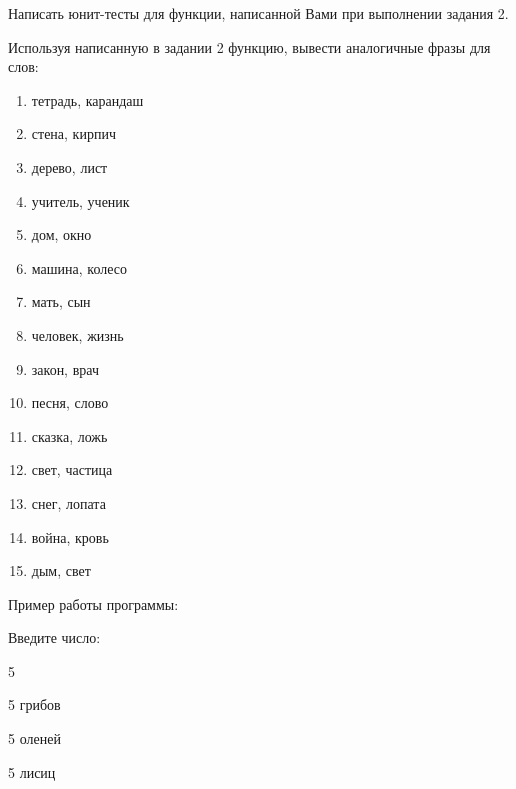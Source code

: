 \labtask

Написать юнит-тесты для функции, написанной Вами при выполнении задания 2.

\labtask

Используя написанную в задании 2 функцию, вывести аналогичные фразы для слов:

\begin{enumerate}

\item 	тетрадь, карандаш

\item 	стена, кирпич

\item 	дерево, лист

\item 	учитель, ученик

\item 	дом, окно

\item 	машина, колесо

\item 	мать, сын

\item 	человек, жизнь

\item 	закон, врач

\item 	песня, слово

\item 	сказка, ложь

\item 	 свет, частица

\item 	снег, лопата

\item 	война, кровь

\item 	дым, свет


\end{enumerate}

Пример работы программы:

Введите число:

5

5 грибов

5 оленей

5 лисиц  


